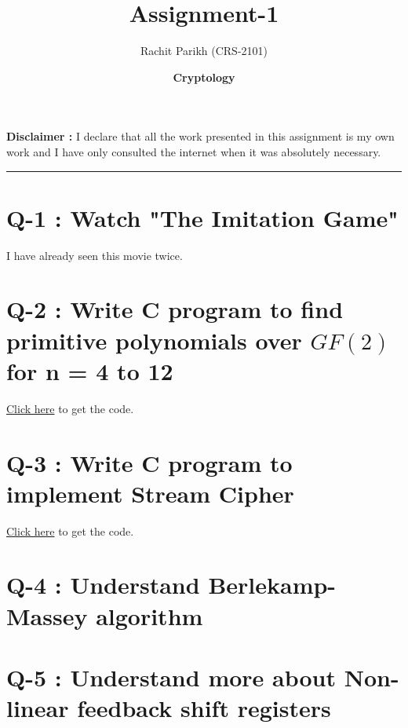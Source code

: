 \documentclass[14pt]{article}
\begin{document}
	
	\title{\color{blue}\Huge \textbf{Assignment-1}} 
	\date{\Large \textbf{Cryptology}}
	\author{Rachit Parikh (CRS-2101)}
	
	\maketitle
	\textbf{Disclaimer : }I declare that all the work presented in this assignment is my own work and I have only consulted the internet when it was absolutely necessary. 
	
	\noindent
	\rule{\linewidth}{0.4pt}
	
	\section*{Q-1 : Watch "The Imitation Game"}
		\noindent
		I have already seen this movie twice.\\
		
	\section*{Q-2 : Write C program to find primitive polynomials over $GF(2)$ for n = 4 to 12}
		\noindent
		\href{https://www.youtube.com/watch?v=ao4RCon11eY}{Click here} to get the code.\\
	\section*{Q-3 : Write C program to implement Stream Cipher}
		\noindent
		\href{https://www.youtube.com/watch?v=aUnTuRnML5Y}{Click here} to get the code.\\
	\section*{Q-4 : Understand Berlekamp-Massey algorithm}
		\noindent
	\section*{Q-5 : Understand more about Non-linear feedback shift registers}
		\noindent
		
	
\end{document}
